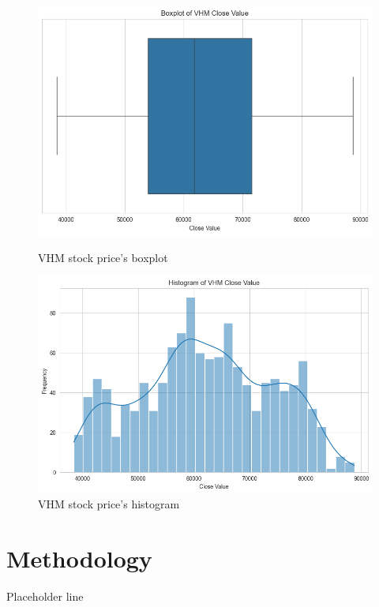 \documentclass{ieeeojies}
\begin{document}
\begin{figure}[H]
  \centering
  \begin{minipage}{0.23\textwidth}
  \centering
  \includegraphics[width=1\textwidth]{bibliography/Figure/VHMboxplot.png}
  \caption{VHM stock price's boxplot}
  \label{fig:1}
  \end{minipage}
  \hfill
  \begin{minipage}{0.23\textwidth}
  \centering
  \includegraphics[width=1\textwidth]{bibliography/Figure/VHMhist.png}
  \caption{VHM stock price's histogram}
  \label{fig:2}
  \end{minipage}
\end{figure}

\section{Methodology}
Placeholder line
\end{document}

